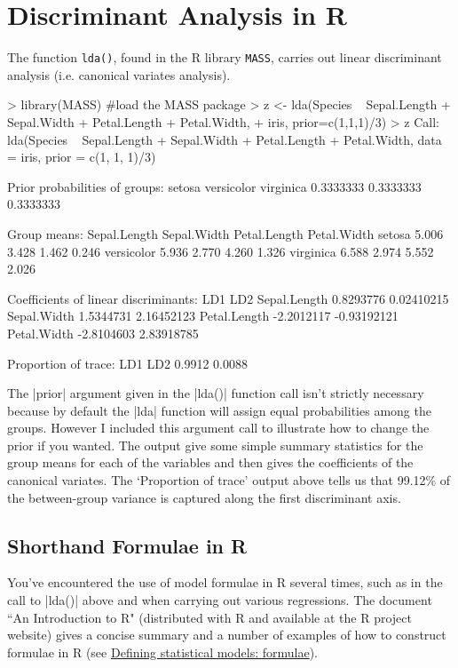 

\section*{Discriminant Analysis in R}

The function \texttt{lda()}, found in the R library \texttt{MASS}, carries out linear discriminant analysis (i.e. canonical variates analysis). 


\begin{Code}
> library(MASS) #load the MASS package
> z <- lda(Species ~ Sepal.Length + Sepal.Width + Petal.Length + Petal.Width,
+           iris, prior=c(1,1,1)/3)
> z
Call:
lda(Species ~ Sepal.Length + Sepal.Width + Petal.Length + Petal.Width, 
    data = iris, prior = c(1, 1, 1)/3)

Prior probabilities of groups:
    setosa versicolor  virginica 
 0.3333333  0.3333333  0.3333333 

Group means:
           Sepal.Length Sepal.Width Petal.Length Petal.Width
setosa            5.006       3.428        1.462       0.246
versicolor        5.936       2.770        4.260       1.326
virginica         6.588       2.974        5.552       2.026

Coefficients of linear discriminants:
                    LD1         LD2
Sepal.Length  0.8293776  0.02410215
Sepal.Width   1.5344731  2.16452123
Petal.Length -2.2012117 -0.93192121
Petal.Width  -2.8104603  2.83918785

Proportion of trace:
   LD1    LD2 
0.9912 0.0088 
\end{Code}

The |prior| argument given in the |lda()| function call isn't strictly necessary because by default the |lda| function will assign equal probabilities among the groups. However I included this argument call to illustrate how to change the prior if you wanted. The output give some simple summary statistics for the group means for each of the variables and then gives the coefficients of the canonical variates.  The `Proportion of trace' output above tells us that 99.12\% of the between-group variance is captured along the first discriminant axis.

\subsection*{Shorthand Formulae in R}

You've encountered the use of model formulae in R several times, such as in the call to |lda()| above and when carrying out various regressions.  The document ``An Introduction to R" (distributed with R and available at the R project website) gives a concise summary and a number of examples of how to construct formulae in R (see \href{http://cran.r-project.org/doc/manuals/R-intro.html#Formulae-for-statistical-models}{Defining statistical models: formulae}).

